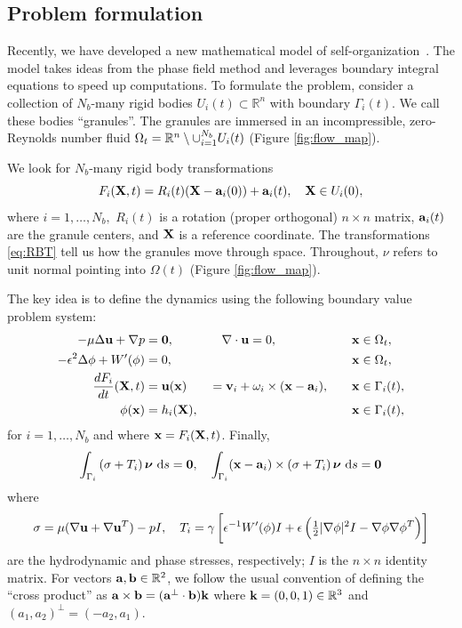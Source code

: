 \subsection{Problem formulation}
Recently, we have developed a new mathematical model of
self-organization~\cite{FuQuRyYo22,fu-ryh-qua-you2022,Fu2018_SIAM}. The
model takes ideas from the phase field method and leverages boundary
integral equations to speed up computations. To formulate the problem,
consider a collection of $N_b$-many rigid bodies $U_i(t) \subset \mathbb{R}^n$
with boundary $\Gamma_i(t)$.
We call these bodies ``granules''.
The granules are immersed 
in an incompressible, zero-Reynolds number fluid
$\Omega_t = \RR^n \setminus \cup_{i=1}^{N_b} U_i(t)$
(Figure \ref{fig:flow_map}).

We look for $N_b$-many rigid body transformations
\begin{equation}
\label{eq:RBT}
F_i(\XX,t) = R_i(t)(\XX - \aa_i(0)) + \aa_i(t),\quad \XX \in U_i(0),
\end{equation}
where $i = 1,\ldots,N_b,$
$R_i(t)$ is a rotation (proper orthogonal) $n \times n$ matrix,
$\aa_i(t)$ are the granule centers, and $\XX$ is a reference coordinate.
The transformations \eqref{eq:RBT} tell us how the granules move through space.
Throughout, $\nu$ refers to unit normal pointing into $\Omega(t)$ (Figure \ref{fig:flow_map}).

The key idea is to define the dynamics using the following
boundary value problem system:
\begin{alignat}{4}
  -\mu\Delta \uu + \nabla p &= \mathbf{0}, 
  &&\quad \nabla \cdot \uu = 0, && \quad \xx \in \Omega_t, \label {eqn:stokes} \\
  \label{eqn:phase}
  -\epsilon^2 \Delta \phi + W'(\phi) &= 0, && &&\quad \xx \in \Omega_t,\\
\label{eqn:noslip}        
\frac{dF_i}{dt}(\XX,t) & = \uu(\xx) 
&&=\vv_i + \omega_i \times (\xx - \aa_i), 
&&\quad \xx \in \Gamma_i(t),\\
\label{eqn:material}
\phi(\xx) &= h_i(\XX), &&  &&\quad \xx \in \Gamma_i(t),
\end{alignat}
for $i=1,\ldots,N_b$
and where $\xx = F_i(\XX,t)$.
Finally,
\begin{equation}
\label{eqn:stressbalance}
\int_{\Gamma_i} \left(\sigma  + T_i\right)\nnu \,\dif s = \mathbf{0},\quad
\int_{\Gamma_i} (\xx - \aa_i)\times \left(\sigma + T_i\right) \nnu \,\dif s = \mathbf{0}
\end{equation}
where
\begin{equation}
\label{eqn:hydro_stress}
\sigma = \mu(\nabla \uu + \nabla \uu^T) - pI,\quad 
T_i = \gamma\left[\epsilon^{-1} W'(\phi)I
  + \epsilon\left(\tfrac{1}{2}|\nabla \phi|^2I - \nabla \phi \nabla
  \phi^T\right)\right]
\end{equation}
are the hydrodynamic and phase stresses, respectively; 
$I$ is the $n\times n$ identity matrix.
For vectors $\aa, \bb \in \mathbb{R}^2$,
we follow the usual convention of defining
the ``cross product'' as
$\aa \times \bb = (\aa^{\perp} \cdot \bb) \kk$
where $\kk = (0,0,1) \in \mathbb{R}^3$ and $(a_1,a_2)^{\perp} = (-a_2,a_1)$.

